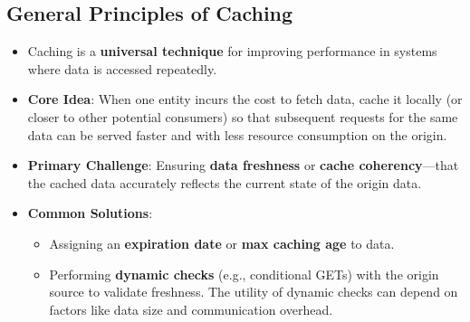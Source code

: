 \documentclass[../../compsys.tex]{subfiles}
\begin{document}
\subsection{General Principles of Caching}
\begin{itemize}
    \item Caching is a \textbf{universal technique} for improving performance in systems where data is accessed repeatedly.
    \item \textbf{Core Idea}: When one entity incurs the cost to fetch data, cache it locally (or closer to other potential consumers) so that subsequent requests for the same data can be served faster and with less resource consumption on the origin.
    \item \textbf{Primary Challenge}: Ensuring \textbf{data freshness} or \textbf{cache coherency}—that the cached data accurately reflects the current state of the origin data.
    \item \textbf{Common Solutions}:
    \begin{itemize}
        \item Assigning an \textbf{expiration date} or \textbf{max caching age} to data.
        \item Performing \textbf{dynamic checks} (e.g., conditional GETs) with the origin source to validate freshness. The utility of dynamic checks can depend on factors like data size and communication overhead.
    \end{itemize}
\end{itemize}
\end{document}
